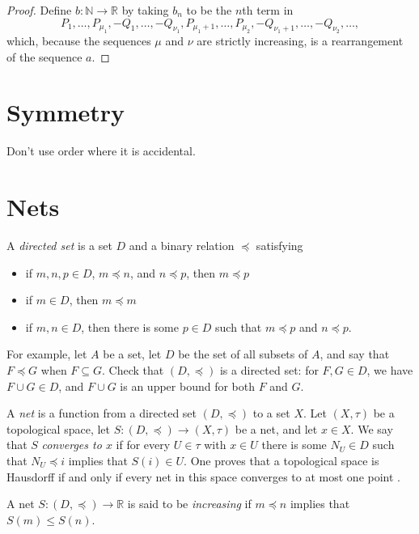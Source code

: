 \documentclass{article}
\begin{document}
\begin{proof}
Define $b:\mathbb{N} \to \mathbb{R}$ by taking $b_n$ to be the $n$th term in 
\[
P_1,\ldots,P_{\mu_1},-Q_1,\ldots,-Q_{\nu_1},P_{\mu_1+1},\ldots,P_{\mu_2},-Q_{\nu_1+1},\ldots,-Q_{\nu_2},\ldots,
\]
which, because the sequences $\mu$ and $\nu$ are strictly increasing, is a rearrangement of the sequence $a$.


\end{proof}


\section{Symmetry}
Don't use order where it is accidental.


\section{Nets}
A {\em directed set} is a set $D$ and a binary relation $\preceq$ satisfying
\begin{itemize}
\item if $m,n,p \in D$, $m \preceq n$, and $n\preceq p$, then $m \preceq p$
\item if $m \in D$, then $m \preceq m$
\item if $m,n \in D$, then there is some $p \in D$ such that $m \preceq p$ and $n \preceq p$.
\end{itemize}
For example, let $A$ be a set, let $D$  be the set of all subsets of $A$, and say that  $F \preceq G$ when $F \subseteq G$. Check that 
$(D,\preceq)$ is a directed set: for $F,G \in D$, we have $F \cup G \in D$,
and $F \cup G$  is an upper bound for both $F$ and $G$. 

A {\em net} is a function from a directed set $(D,\preceq)$ to a set $X$. 
Let $(X,\tau)$ be a topological space, let $S:(D,\preceq) \to (X,\tau)$ be a net, and let $x \in X$. We say that $S$ {\em converges to $x$} if for every $U \in \tau$ with $x \in U$
 there is some $N_U \in D$ such that $N_U \preceq i$ implies that $S(i) \in U$. One proves that a topological space is Hausdorff if and only if every net in this space converges to at most one
point  \cite[p.~67, Theorem 3]{kelley}.

A net $S:(D,\preceq) \to \mathbb{R}$ is said to be {\em increasing} if $m \preceq n$ implies that $S(m) \leq S(n)$.
\end{document}
